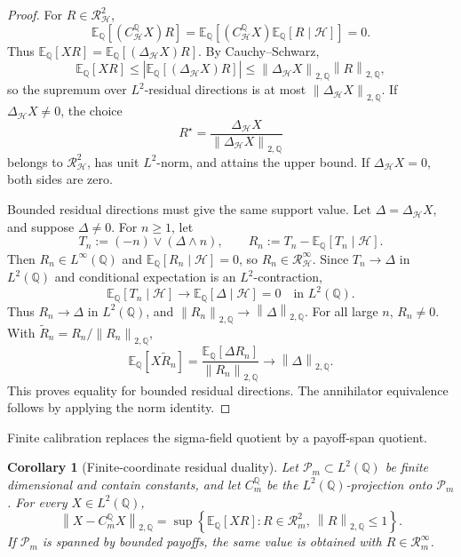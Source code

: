 \documentclass[11pt,a4paper]{amsart}
\theoremstyle{plain}
\newtheorem{corollary}[theorem]{Corollary}
\theoremstyle{definition}
\theoremstyle{remark}
\newcommand{\QQ}{\mathbb{Q}}
\newcommand{\EE}{\mathbb{E}}
\newcommand{\cH}{\mathcal{H}}
\newcommand{\cP}{\mathcal{P}}
\newcommand{\cR}{\mathcal{R}}
\newcommand{\norm}[1]{\left\lVert #1\right\rVert}
\begin{document}
\begin{proof}
For \(R\in\cR_{\cH}^{2}\),
\[
        \EE_\QQ[(C_{\cH}^{\QQ}X)R]
        =
        \EE_\QQ[(C_{\cH}^{\QQ}X)\EE_\QQ[R\mid\cH]]
        =
        0.
\]
Thus \(\EE_\QQ[XR]=\EE_\QQ[(\Delta_{\cH}X)R]\).  By Cauchy--Schwarz,
\[
        \EE_\QQ[XR]
        \le
        |\EE_\QQ[(\Delta_{\cH}X)R]|
        \le
        \norm{\Delta_{\cH}X}_{2,\QQ}\norm{R}_{2,\QQ},
\]
so the supremum over \(L^2\)-residual directions is at most
\(\norm{\Delta_{\cH}X}_{2,\QQ}\).  If \(\Delta_{\cH}X\ne0\), the choice
\[
        R^\star=\frac{\Delta_{\cH}X}{\norm{\Delta_{\cH}X}_{2,\QQ}}
\]
belongs to \(\cR_{\cH}^{2}\), has unit \(L^2\)-norm, and attains the upper bound.  If
\(\Delta_{\cH}X=0\), both sides are zero.

Bounded residual directions must give the same support value.  Let
\(\Delta=\Delta_{\cH}X\), and suppose \(\Delta\ne0\).  For \(n\ge1\), let
\[
        T_n:=(-n)\vee(\Delta\wedge n),
        \qquad
        R_n:=T_n-\EE_\QQ[T_n\mid\cH].
\]
Then \(R_n\in L^\infty(\QQ)\) and \(\EE_\QQ[R_n\mid\cH]=0\), so
\(R_n\in\cR_{\cH}^{\infty}\).  Since \(T_n\to\Delta\) in \(L^2(\QQ)\) and conditional expectation
is an \(L^2\)-contraction,
\[
        \EE_\QQ[T_n\mid\cH]\to \EE_\QQ[\Delta\mid\cH]=0
        \quad\text{in }L^2(\QQ).
\]
Thus \(R_n\to\Delta\) in \(L^2(\QQ)\), and
\(\norm{R_n}_{2,\QQ}\to\norm{\Delta}_{2,\QQ}\).  For all large \(n\), \(R_n\ne0\).  With
\(\widetilde R_n=R_n/\norm{R_n}_{2,\QQ}\),
\[
        \EE_\QQ[X\widetilde R_n]
        =
        \frac{\EE_\QQ[\Delta R_n]}{\norm{R_n}_{2,\QQ}}
        \longrightarrow
        \norm{\Delta}_{2,\QQ}.
 \]
This proves equality for bounded residual directions.  The annihilator equivalence follows by
applying the norm identity.
\end{proof}

Finite calibration replaces the sigma-field quotient by a payoff-span quotient.

\begin{corollary}[Finite-coordinate residual duality]\label{cor:finite-coordinate-duality}
Let \(\cP_m\subset L^2(\QQ)\) be finite dimensional and contain constants, and let \(C_m^\QQ\) be
the \(L^2(\QQ)\)-projection onto \(\cP_m\).  For every \(X\in L^2(\QQ)\),
\[
        \norm{X-C_m^\QQ X}_{2,\QQ}
        =
        \sup\left\{
        \EE_\QQ[XR]:
        R\in\cR_m^2,\ \norm{R}_{2,\QQ}\le1
        \right\}.
\]
If \(\cP_m\) is spanned by bounded payoffs, the same value is obtained with
\(R\in\cR_m^\infty\).
\end{corollary}
\end{document}

